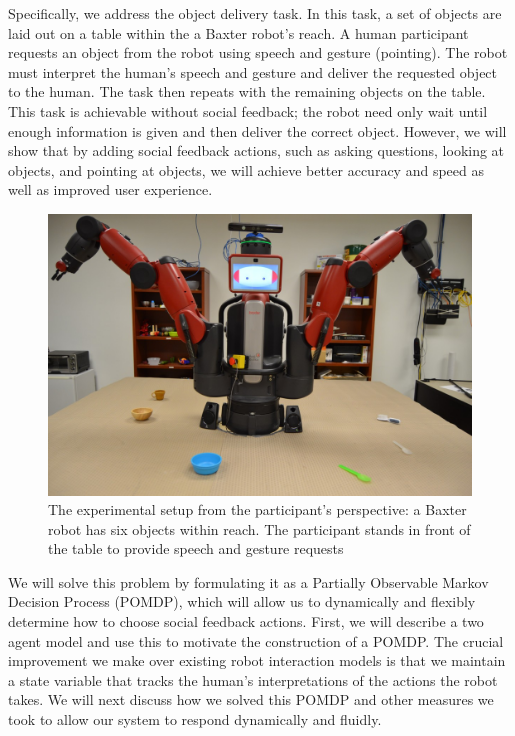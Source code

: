\documentclass{article}
\begin{document}
\begin{multicols}{2}
Specifically, we address the object delivery task. In this task, a set of objects are laid out on a table within the a Baxter robot's reach. A human participant requests an object from the robot using speech and gesture (pointing). The robot must interpret the human's speech and gesture and deliver the requested object to the human. The task then repeats with the remaining objects on the table. This task is achievable without social feedback; the robot need only wait until enough information is given and then deliver the correct object. However, we will show that by adding social feedback actions, such as asking questions, looking at objects, and pointing at objects, we will achieve better accuracy and speed as well as improved user experience. 

\begin{figure}[H]
	\begin{center}
		\includegraphics[scale=0.17]{firstPerson}
		\caption{The experimental setup from the participant's perspective: a Baxter robot has six objects within reach. The participant stands in front of the table to provide speech and gesture requests}
	\end{center}
\end{figure}

We will solve this problem by formulating it as a Partially Observable Markov Decision Process (POMDP)\citep{kaelbling99}, which will allow us to dynamically and flexibly determine how to choose social feedback actions. First, we will describe a two agent model and use this to motivate the construction of a POMDP. The crucial improvement we make over existing robot interaction models is that we maintain a state variable that tracks the human's interpretations of the actions the robot takes. We will next discuss how we solved this POMDP and other measures we took to allow our system to respond dynamically and fluidly. 


\end{multicols}
\end{document}

